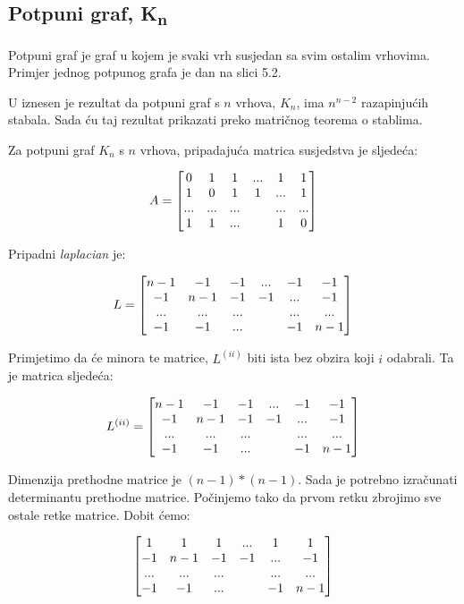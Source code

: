 \documentclass[times, utf8, zavrsni]{fer}
\begin{document}
\subsection{Potpuni graf, K\textsubscript{n}}

Potpuni graf je graf u kojem je svaki vrh susjedan sa svim ostalim vrhovima. Primjer jednog potpunog grafa je dan na slici 5.2.

U \cite{KKNP} iznesen je rezultat da potpuni graf s $n$ vrhova, $K_n$, ima $n^{n-2}$ razapinjućih stabala. Sada ću taj rezultat prikazati preko matričnog teorema o stablima.

Za potpuni graf $K_n$ s $n$ vrhova, pripadajuća matrica susjedstva je sljedeća:

\[
\centering
A = 
\begin{bmatrix}
	0 & 1 & 1 & ... & 1 & 1 \\
	1 & 0 & 1 & 1 & ... & 1 \\
	... & ... & ... & & ... & ...  \\
	1 & 1 & ... & & 1 & 0
\end{bmatrix}
\]

Pripadni \textit{laplacian} je:

\[
\centering
L = 
\begin{bmatrix}
	n-1 & -1 & -1 & ... & -1 & -1 \\
	-1 & n-1 & -1 & -1 & ... & -1 \\
	... & ... & ... & & ... & ...  \\
	-1 & -1 & ... & & -1 & n-1
\end{bmatrix}
\]

Primjetimo da će minora te matrice, $L^{(ii)}$ biti ista bez obzira koji $i$ odabrali. Ta je matrica sljedeća:

\[
\centering
L^{(ii)} = 
\begin{bmatrix}
	n-1 & -1 & -1 & ... & -1 & -1 \\
	-1 & n-1 & -1 & -1 & ... & -1 \\
	... & ... & ... & & ... & ...  \\
	-1 & -1 & ... & & -1 & n-1
\end{bmatrix}
\]

Dimenzija prethodne matrice je $(n-1)*(n-1)$. Sada je potrebno izračunati determinantu prethodne matrice. Počinjemo tako da prvom retku zbrojimo sve ostale retke matrice. Dobit ćemo:

\[
\centering
\begin{bmatrix}
	1 & 1 & 1 & ... & 1 & 1 \\
	-1 & n-1 & -1 & -1 & ... & -1 \\
	... & ... & ... & & ... & ...  \\
	-1 & -1 & ... & & -1 & n-1
\end{bmatrix}
\]
\end{document}
